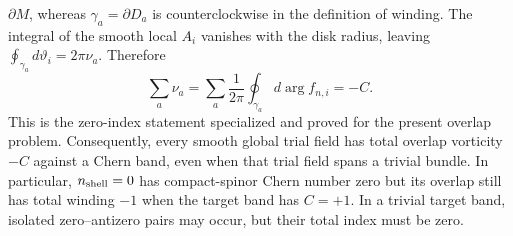 \documentclass[aps,prx,twocolumn,floatfix,nofootinbib,superscriptaddress,longbibliography]{revtex4-2}
\begin{document}
$\partial M$, whereas $\gamma_a=\partial D_a$ is counterclockwise in the definition of
winding.  The integral of the smooth local $A_i$ vanishes with the disk radius, leaving
$\oint_{\gamma_a}d\vartheta_i=2\pi\nu_a$.  Therefore
\begin{equation}
 \boxed{\displaystyle
 \sum_a\nu_a
 =\sum_a\frac{1}{2\pi}\oint_{\gamma_a}d\arg f_{n,i}
 =-C.}
 \label{eq:overlap-index-theorem}
\end{equation}
This is the zero-index statement specialized and proved for the present overlap problem.
Consequently, every smooth global trial field has total overlap vorticity $-C$ against a
Chern band, even when that trial field spans a trivial bundle.  In particular,
$n_{\rm shell}=0$ has compact-spinor Chern number zero but its overlap still has total
winding $-1$ when the target band has $C=+1$.  In a trivial target band, isolated
zero--antizero pairs may occur, but their total index must be zero.
\end{document}
